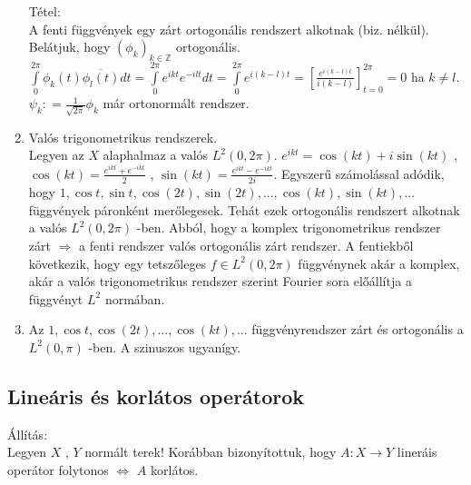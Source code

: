 \documentclass[12pt,a4paper]{scrartcl}
\newenvironment{tetel}{}{}
\newenvironment{allitas}{}{}
\newenvironment{pelda}{}{}
\begin{document}
\begin{pelda}
\begin{enumerate}
  \begin{tetel}

  Tétel:\\
  A fenti függvények egy zárt ortogonális rendszert alkotnak (biz.
  nélkül). Belátjuk, hogy
  \(\left( \phi_{k} \right)_{k \in {\mathbb{Z}}}\) ortogonális.
  \({\int\limits_{0}^{2\pi}{\phi_{k}\left( t \right)\overline{\phi_{l}\left( t \right)}dt}} = {\int\limits_{0}^{2\pi}{e^{ikt}e^{- ilt}dt}} = {\int\limits_{0}^{2\pi}e^{i{({k - l})}t}} = \left\lbrack \frac{e^{i{({k - l})}t}}{i\left( {k - l} \right)} \right\rbrack_{t = 0}^{2\pi} = 0\)
  ha \(k \neq l\). \(\psi_{k}: = \frac{1}{\sqrt{2\pi}}\phi_{k}\) már
  ortonormált rendszer.

  \end{tetel}
\item
  Valós trigonometrikus rendszerek.\\
  Legyen az \(X\) alaphalmaz a valós \(L^{2}\left( {0,2\pi} \right)\).
  \(e^{ikt} = \cos\left( {kt} \right) + i\sin\left( {kt} \right)\) ,
  \(\cos\left( {kt} \right) = \frac{e^{ikt} + e^{- ikt}}{2}\) ,
  \(\sin\left( {kt} \right) = \frac{e^{ikt} - e^{- ikt}}{2i}\). Egyszerű
  számolással adódik, hogy
  \(1,\cos t,\sin t,\cos\left( {2t} \right),\sin\left( {2t} \right),...,\cos\left( {kt} \right),\sin\left( {kt} \right),...\)
  függvények páronként merőlegesek. Tehát ezek ortogonális rendszert
  alkotnak a valós \(L^{2}\left( {0,2\pi} \right)\) -ben. Abból, hogy a
  komplex trigonometrikus rendszer zárt \(\Rightarrow\) a fenti rendszer
  valós ortogonális zárt rendszer. A fentiekből következik, hogy egy
  tetszőleges \(f \in L^{2}\left( {0,2\pi} \right)\) függvénynek akár a
  komplex, akár a valós trigonometrikus rendszer szerint Fourier sora
  előállítja a függvényt \(L^{2}\) normában.
\item
  Az
  \(1,\cos t,\cos\left( {2t} \right),...,\cos\left( {kt} \right),...\)
  függvényrendszer zárt és ortogonális a \(L^{2}\left( {0,\pi} \right)\)
  -ben. A szinuszos ugyanígy.
\end{enumerate}

\end{pelda}

\hypertarget{linearis-es-korlatos-operatorok}{%
\subsection{Lineáris és korlátos
operátorok}\label{linearis-es-korlatos-operatorok}}

\begin{allitas}

Állítás:\\
Legyen \(X\) , \(Y\) normált terek! Korábban bizonyítottuk, hogy
\(\left. A:X\rightarrow Y \right.\) lineráis operátor folytonos
\(\Leftrightarrow\) \(A\) korlátos.

\end{allitas}
\end{document}
